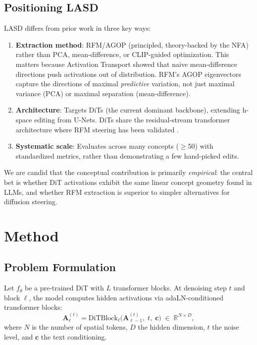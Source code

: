 \documentclass[11pt]{article}
\newcommand{\R}{\mathbb{R}}
\newcommand{\bA}{\mathbf{A}}
\newcommand{\bc}{\mathbf{c}}
\begin{document}
\subsection{Positioning LASD}

LASD differs from prior work in three key ways:
\begin{enumerate}[leftmargin=*]
    \item \textbf{Extraction method}: RFM/AGOP (principled, theory-backed by the NFA) rather than PCA, mean-difference, or CLIP-guided optimization.
    This matters because Activation Transport \citep{lyu2025activation} showed that naive mean-difference directions push activations out of distribution.
    RFM's AGOP eigenvectors capture the directions of maximal \emph{predictive} variation, not just maximal variance (PCA) or maximal separation (mean-difference).
    \item \textbf{Architecture}: Targets DiTs (the current dominant backbone), extending h-space editing from U-Nets.
    DiTs share the residual-stream transformer architecture where RFM steering has been validated \citep{beaglehole2026universal}.
    \item \textbf{Systematic scale}: Evaluates across many concepts ($\geq$50) with standardized metrics, rather than demonstrating a few hand-picked edits.
\end{enumerate}

We are candid that the conceptual contribution is primarily \emph{empirical}: the central bet is whether DiT activations exhibit the same linear concept geometry found in LLMs, and whether RFM extraction is superior to simpler alternatives for diffusion steering.

\section{Method}
\label{sec:method}

\subsection{Problem Formulation}

Let $f_\theta$ be a pre-trained DiT with $L$ transformer blocks.
At denoising step $t$ and block $\ell$, the model computes hidden activations via adaLN-conditioned transformer blocks:
\begin{equation}
    \bA_\ell^{(t)} = \mathrm{DiTBlock}_\ell\bigl(\bA_{\ell-1}^{(t)},\; t,\; \bc\bigr) \;\in\; \R^{N \times D},
\end{equation}
where $N$ is the number of spatial tokens, $D$ the hidden dimension, $t$ the noise level, and $\bc$ the text conditioning.
\end{document}
